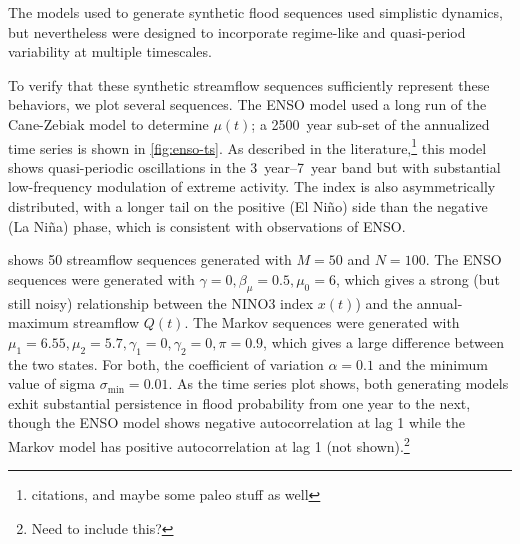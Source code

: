 \documentclass[11pt]{article}
\begin{document}
The models used to generate synthetic flood sequences used simplistic dynamics, but nevertheless were designed to incorporate regime-like and quasi-period variability at multiple timescales.

To verify that these synthetic streamflow sequences sufficiently represent these behaviors, we plot several sequences.
The ENSO model used a long run of the Cane-Zebiak model \citep{Zebiak1987,Ramesh2017} to determine \(\mu(t)\); a \SI{2500}{year} sub-set of the annualized time series is shown in \cref{fig:enso-ts}.
As described in the literature,\footnote{citations, and maybe some paleo stuff as well} this model shows quasi-periodic oscillations in the \SIrange{3}{7}{year} band but with substantial low-frequency modulation of extreme activity.
The index is also asymmetrically distributed, with a longer tail on the positive (El Ni\~{n}o) side than the negative (La Ni\~{n}a) phase, which is consistent with observations of ENSO.

 shows 50 streamflow sequences generated with \(M=50\) and \(N=100\).
The ENSO sequences were generated with \(\gamma=0, \beta_\mu=0.5, \mu_0=6\), which gives a strong (but still noisy) relationship between the NINO3 index \(x(t)\)) and the annual-maximum streamflow \(Q(t)\).
The Markov sequences were generated with \(\mu_1 = 6.55, \mu_2=5.7, \gamma_1=0, \gamma_2=0, \pi=0.9\), which gives a large difference between the two states.
For both, the coefficient of variation \(\alpha=0.1\) and the minimum value of sigma \(\sigma_\text{min}=0.01\).
As the time series plot shows, both generating models exhit substantial persistence in flood probability from one year to the next, though the ENSO model shows negative autocorrelation at lag 1 while the Markov model has positive autocorrelation at lag 1 (not shown).\footnote{Need to include this?}
\end{document}
